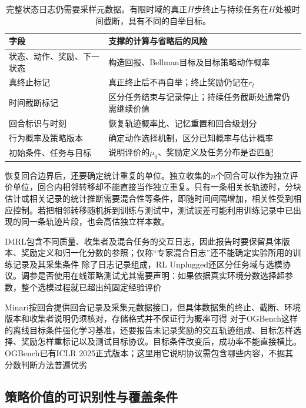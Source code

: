 \begin{table}[htbp]
  \centering
  \small
  \begin{tabularx}{\linewidth}{p{29mm}X}
    \toprule
    字段 & 支撑的计算与省略后的风险 \\
    \midrule
    状态、动作、奖励、下一状态 & 构造回报、Bellman目标及目标策略动作概率 \\
    真终止标记 & 真正终止后不再自举；终止奖励仍记在$r_t$ \\
    时间截断标记 & 区分任务结束与记录停止；持续任务截断处通常仍需继续价值 \\
    回合标识与时刻 & 恢复轨迹概率比、记忆重置和回合级划分 \\
    行为概率及策略版本 & 确定动作选择机制，区分已知概率与估计概率 \\
    初始条件、任务与目标 & 说明评价的$\mu_0$、奖励定义及任务分布是否匹配 \\
    \bottomrule
  \end{tabularx}
  \caption{完整状态日志仍需要采样元数据。有限时域的真正$H$步终止与持续任务在$H$处被时间截断，具有不同的自举目标。}
  \label{tab:rl-information-fields}
\end{table}

恢复回合边界后，还要确定统计重复的单位。独立收集的$n$个回合可以作为独立评价单位，回合内相邻转移却不能直接当作独立重复。只有一条相关长轨迹时，分块估计或相关记录的统计推断需要混合性等条件，即随时间间隔增加，相关性受到相应控制。若把相邻转移随机拆到训练与测试中，测试误差可能利用训练记录中已出现的同一条轨迹片段，也会高估独立样本数。

D4RL包含不同质量、收集者及混合任务的交互日志，因此报告时要保留具体版本、奖励定义和归一化分数的参照；仅称“专家混合日志”还不能确定实验所用的训练记录及其采集条件
除了日志记录组成，RL Unplugged还区分任务域与选模协议。调参是否使用在线策略测试尤其需要声明：如果依据真实环境分数选择超参数，整个选模过程就已超出纯固定经验评价

Minari按回合提供回合记录及采集元数据接口，但具体数据集的终止、截断、环境版本和收集者说明仍须核对，存储格式并不保证行为概率可得
对于OGBench这样的离线目标条件强化学习基准，还要报告未记录奖励的交互轨迹组成、目标怎样选择、奖励怎样重标记以及测试目标协议。目标条件改变后，成功率不能直接横比。OGBench已有ICLR 2025正式版本；这里用它说明协议需包含哪些内容，不据其分数判断方法普遍优劣

\subsection{策略价值的可识别性与覆盖条件}
\label{sec:rl-information-coverage}

